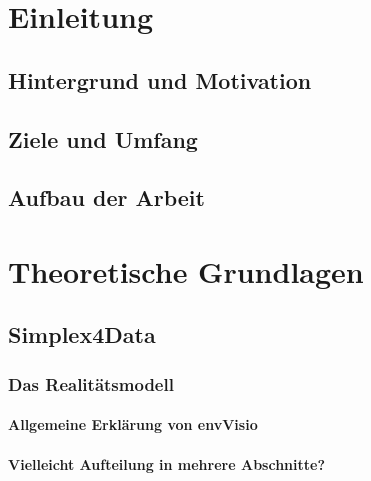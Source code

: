 \documentclass[oneside,a4paper,11pt,openright]{scrreprt}
\begin{document}

\cleardoublepage

\tableofcontents

\listoffigures

\listoftables

\lstlistoflistings

\printacronyms



\chapter{Einleitung}

\section{Hintergrund und Motivation}
\section{Ziele und Umfang}
\section{Aufbau der Arbeit}

\chapter{Theoretische Grundlagen}

\section{Simplex4Data}
\parencite{rudolfUmweltdatenmanagementGeoInspiration2018}
\parencite{grossmannEnvVisioUniverselle2021}
\parencite{grossmannEnvVisioService2022}
\subsection{Das Realitätsmodell}
\subsubsection{Allgemeine Erklärung von envVisio}
\subsubsection{Vielleicht Aufteilung in mehrere Abschnitte?}
\end{document}
